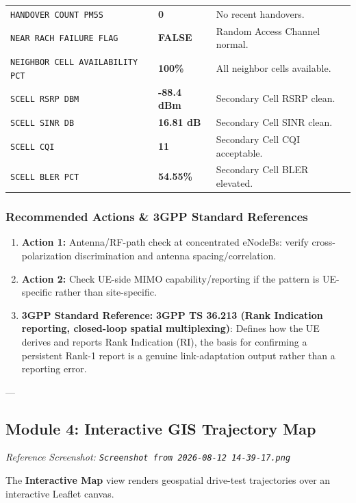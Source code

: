 \documentclass[12pt,a4paper]{report}
\begin{document}
\begin{table}[htbp]
\begin{tabular}{lll}
\texttt{HANDOVER COUNT PM5S} & \textbf{0} & No recent handovers. \\
\texttt{NEAR RACH FAILURE FLAG} & \textbf{FALSE} & Random Access Channel normal. \\
\texttt{NEIGHBOR CELL AVAILABILITY PCT} & \textbf{100\%} & All neighbor cells available. \\
\texttt{SCELL RSRP DBM} & \textbf{-88.4 dBm} & Secondary Cell RSRP clean. \\
\texttt{SCELL SINR DB} & \textbf{16.81 dB} & Secondary Cell SINR clean. \\
\texttt{SCELL CQI} & \textbf{11} & Secondary Cell CQI acceptable. \\
\texttt{SCELL BLER PCT} & \textbf{54.55\%} & Secondary Cell BLER elevated. \\
\bottomrule
\end{tabular}
\end{table}

\subsubsection{Recommended Actions \& 3GPP Standard References}
\begin{enumerate}
    \item \textbf{Action 1:} Antenna/RF-path check at concentrated eNodeBs: verify cross-polarization discrimination and antenna spacing/correlation.
    \item \textbf{Action 2:} Check UE-side MIMO capability/reporting if the pattern is UE-specific rather than site-specific.
    \item \textbf{3GPP Standard Reference:} \textbf{3GPP TS 36.213 (Rank Indication reporting, closed-loop spatial multiplexing)}: Defines how the UE derives and reports Rank Indication (RI), the basis for confirming a persistent Rank-1 report is a genuine link-adaptation output rather than a reporting error.
\end{enumerate}

---

\subsection{Module 4: Interactive GIS Trajectory Map}
\textit{Reference Screenshot: \texttt{Screenshot from 2026-08-12 14-39-17.png}}

The \textbf{Interactive Map} view renders geospatial drive-test trajectories over an interactive Leaflet canvas.
\end{document}
